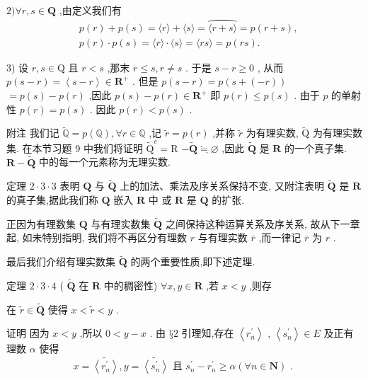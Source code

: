$2)\forall r,s \in  \mathbf{Q}$ ,由定义我们有
\begin{align*}
	&p\left( r\right)  + p\left( s\right)  = \langle r\rangle  + \langle s\rangle  = \overset{⏜}{\langle r + s\rangle } = p\left( {r + s}\right) ,\\
	&p\left( r\right)  \cdot  p\left( s\right)  = \langle r\rangle  \cdot  \langle s\rangle  = \langle {rs}\rangle  = p\left( {rs}\right) .
\end{align*}

3) 设 $r,s \in  \mathrm{Q}$ 且 $r < s$ ,那末 $r \leq  s,r \neq  s$ . 于是 $s - r \geq  0$ , 从而 $p\left( {s - r}\right)  = \left\langle  {s - r}\right\rangle   \in  {\mathbf{R}}^{ + }$ . 但是 $p\left( {s - r}\right)  = p\left( {s + \left( {-r}\right) }\right)$  $= p\left( s\right)  - p\left( r\right)$ ,因此 $p\left( s\right)  - p\left( r\right)  \in  {\mathbf{R}}^{ + }$ 即 $p\left( r\right)  \leq  p\left( s\right)$ . 由于 $p$ 的单射性 $p\left( r\right)  = p\left( s\right)$ . 因此 $p\left( r\right)  < p\left( s\right)$ .

附注 我们记 $\widetilde{\mathbb{Q}} = p\left( \mathbb{Q}\right) ,\forall r \in  \mathbb{Q}$ ,记 $\widetilde{r} = p\left( r\right)$ ,并称 $\widetilde{r}$ 为有理实数, $\widetilde{\mathrm{Q}}$ 为有理实数集. 在本节习题 9 中我们将证明 ${\widetilde{\mathrm{Q}}}^{c} = \mathrm{R}$  $- \widetilde{\mathbf{Q}} \fallingdotseq  \varnothing$ ,因此 $\widetilde{\mathbf{Q}}$ 是 $\mathbf{R}$ 的一个真子集. $\mathbf{R} - \widetilde{\mathbf{Q}}$ 中的每一个元素称为无理实数.

定理 $2 \cdot  3 \cdot  3$ 表明 $\mathbf{Q}$ 与 $\widetilde{\mathbf{Q}}$ 上的加法、乘法及序关系保持不变, 又附注表明 $\widetilde{\mathbf{Q}}$ 是 $\mathbf{R}$ 的真子集,据此我们称 $\mathbf{Q}$ 嵌入 $\mathbf{R}$ 中 或 $\mathbf{R}$ 是 $\mathbf{Q}$ 的扩张.

正因为有理数集 $\mathbf{Q}$ 与有理实数集 $\widetilde{\mathbf{Q}}$ 之间保持这种运算关系及序关系, 故从下一章起, 如未特别指明, 我们将不再区分有理数 $r$ 与有理实数 $\bar{r}$ ,而一律记 $\bar{r}$ 为 $r$ .

最后我们介绍有理实数集 $\widetilde{\mathbf{Q}}$ 的两个重要性质,即下述定理.

定理 $2 \cdot  3 \cdot  4$ ( $\widetilde{\mathbf{Q}}$ 在 $\mathbf{R}$ 中的稠密性) $\forall x,y \in  \mathbf{R}$ ,若 $x < y$ ,则存

在 $\widetilde{r} \in  \widetilde{\mathbf{Q}}$ 使得 $x < \widetilde{r} < y$ .

证明 因为 $x < y$ ,所以 $0 < y - x$ . 由 $§2$ 引理知,存在 $\left\langle  {r}_{n}^{\prime }\right\rangle$ , $\left\langle  {s}_{n}^{\prime }\right\rangle   \in  E$ 及正有理数 $\alpha$ 使得
$$x = \widetilde{\left\langle  {r}_{n}^{\prime }\right\rangle  },y = \widetilde{\left\langle  {s}_{n}^{\prime }\right\rangle  }\text{ 且 }{s}_{n}^{\prime } - {r}_{n}^{\prime } \geq  \alpha \left( {\forall n \in  \mathbf{N}}\right) \text{ . }$$

